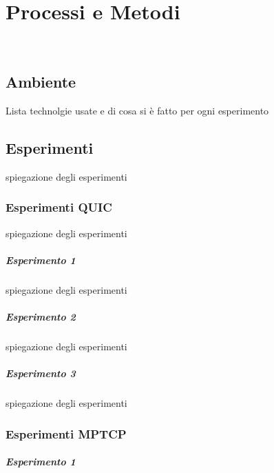 \chapter{Processi e Metodi}
\label{cap:processi-metodologie}

\\

\section{Ambiente}

Lista technolgie usate e di cosa si è fatto per ogni esperimento

\section{Esperimenti}

spiegazione degli esperimenti

\subsection{Esperimenti QUIC}

spiegazione degli esperimenti

\paragraph{Esperimento 1}
spiegazione degli esperimenti
\paragraph{Esperimento 2}
spiegazione degli esperimenti
\paragraph{Esperimento 3}
spiegazione degli esperimenti

\subsection{Esperimenti MPTCP}
\paragraph{Esperimento 1}

